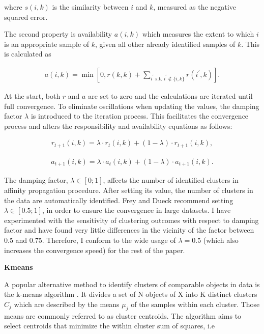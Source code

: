 \documentclass[a4paper,12pt]{article}
\newcommand{\citeyearonly}[1]{\citeyearpar{#1}}
\begin{document}
where $s\left(i,k\right)$ is the similarity between $i$ and $k$, measured as the negative squared error.

The second property is availability $a\left(i,k\right)$ which measures the extent to which $i$ is an appropriate sample of $k$, given all other already identified samples of $k$. This is calculated as

\begin{align}\label{eq:availabilityAffinityPropagation}
    a\left(i,k\right) = \min\left[0, r\left(k,k\right) + \sum_{i^\prime \text{ s.t. } i^\prime \notin \{i,k\}} r\left(i^\prime,k\right)\right].
\end{align}

At the start, both $r$ and $a$ are set to zero and the calculations are iterated until full convergence. To eliminate oscillations when updating the values, the damping factor $\lambda$ is introduced to the iteration process. This facilitates the convergence process and alters the responsibility and availability equations as follows:

\begin{align}\label{eq:responsibilityAffinityPropagation}
    r_{t+1}\left(i,k\right) = \lambda \cdot r_t\left(i,k\right) + (1-\lambda) \cdot r_{t+1}\left(i,k\right),
\end{align}

\begin{align}
    a_{t+1}\left(i,k\right) = \lambda \cdot a_t\left(i,k\right) + (1-\lambda) \cdot a_{t+1}\left(i,k\right).
\end{align}


The damping factor,  $\lambda\in[0;1]$, affects the number of identified clusters in affinity propagation procedure. After setting its value, the number of clusters in the data are automatically identified. Frey and Dueck \citeyearonly{freyDueck07} recommend setting  $\lambda\in[0.5;1]$, in order to ensure the convergence in large datasets. I have experimented with the sensitivity of clustering outcomes with respect to damping factor and have found very little differences in the vicinity of the factor between 0.5 and 0.75. Therefore, I conform to the wide usage of $\lambda=0.5$ (which also increases the convergence speed) for the rest of the paper.

\textbf{Kmeans}

A popular alternative method to identify clusters of comparable objects in data is the k-means algorithm \citep{lloyd82}. It divides a set of N objects of X into K distinct clusters $C_j$  which are described by the means $\mu_j$ of the samples within each cluster. Those means are commonly referred to as cluster centroids. The algorithm aims to select centroids that minimize the within cluster sum of squares, i.e
\end{document}
